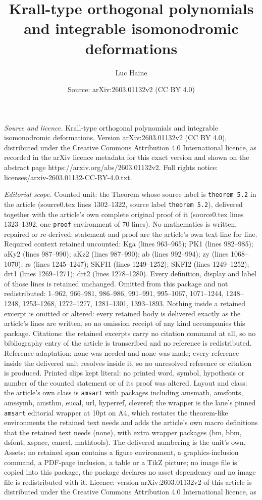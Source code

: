 \documentclass[10pt,a4paper]{amsart}
\title[Krall-type orthogonal polynomials and integrable isomonodrom]{Krall-type orthogonal polynomials and integrable isomonodromic deformations}
\author{Luc Haine}
\date{Source: arXiv:2603.01132v2 (CC BY 4.0)}
\begin{document}
\maketitle

\noindent\emph{Source and licence.} Krall-type orthogonal polynomials and integrable isomonodromic deformations. Version arXiv:2603.01132v2 (CC BY 4.0), distributed under the Creative Commons Attribution 4.0 International licence, as recorded in the arXiv licence metadata for this exact version and shown on the abstract page https://arxiv.org/abs/2603.01132v2. Full rights notice: licenses/arxiv-2603.01132-CC-BY-4.0.txt.\par\smallskip

\noindent\textit{Editorial scope.} Counted unit: the Theorem whose source label is \texttt{theorem 5.2} in the article (source0.tex lines 1302--1322, source label \texttt{theorem 5.2}), delivered together with the article's own complete original proof of it (source0.tex lines 1323--1392, one \texttt{proof} environment of 70 lines). No mathematics is written, repaired or re-derived: statement and proof are the article's own text line for line. Required context retained uncounted: Kga (lines 963--965); PK1 (lines 982--985); aKy2 (lines 987--990); aKz2 (lines 987--990); ab (lines 992--994); zy (lines 1068--1070); rs (lines 1245--1247); SKFI1 (lines 1249--1252); SKFI2 (lines 1249--1252); drt1 (lines 1269--1271); drt2 (lines 1278--1280). Every definition, display and label of those lines is retained unchanged. Omitted from this package and not redistributed: 1--962, 966--981, 986--986, 991--991, 995--1067, 1071--1244, 1248--1248, 1253--1268, 1272--1277, 1281--1301, 1393--1893. Nothing inside a retained excerpt is omitted or altered: every retained body is delivered exactly as the article's lines are written, so no omission receipt of any kind accompanies this package. Citations: the retained excerpts carry no citation command at all, so no bibliography entry of the article is transcribed and no reference is redistributed. Reference adaptation: none was needed and none was made; every reference inside the delivered unit resolves inside it, so no unresolved reference or citation is produced. Printed slips kept literal: no printed word, symbol, hypothesis or number of the counted statement or of its proof was altered. Layout and class: the article's own class is \texttt{amsart} with packages including amsmath, amsfonts, amssymb, amsthm, eucal, url, hyperref, cleveref; the wrapper is the lane's pinned \texttt{amsart} editorial wrapper at 10pt on A4, which restates the theorem-like environments the retained text needs and adds the article's own macro definitions that the retained text needs (none), with extra wrapper packages (bm, bbm, dsfont, xspace, cancel, mathtools). The delivered numbering is the unit's own. Assets: no retained span contains a figure environment, a graphics-inclusion command, a PDF-page inclusion, a table or a TikZ picture; no image file is copied into this package, the package declares no asset dependency and no image file is redistributed with it. Licence: version arXiv:2603.01132v2 of this article is distributed under the Creative Commons Attribution 4.0 International licence, as 
\end{document}
